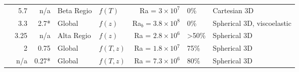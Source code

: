 \begin{landscape}
\begin{longtable}{ @{} p{4cm} r r p{2cm} p{2cm} r p{1.5cm} p{5cm} @{} }
\citet{Vezolainen2004} & 5.7 & n/a & Beta Regio & $f(T)$  & Ra = $3 \times 10^7$ & 0\% & Cartesian 3D \\






\citet{Golle2012} & 3.3 & 2.7*  & Global & $f(z)$ & Ra$_b = 3.8\times 10^8$ & 0\% & Spherical 3D, viscoelastic  \\



\citet{Benesova2012} &  3.25 & n/a   & Alta Regio  & $f(z)$ & Ra = $2.8 \times 10^6$ & \textgreater 50\% & Spherical 3D  \\



\citet{Huang2013} & 2\textendash 3 & 0.75 & Global & $f(T,z)$ & Ra = $1.8\times 10^7$ & 75\% & Spherical 3D  \\

\citet{Yang2016} & n/a & 0.27* & Global & $f(T,z)$ &  Ra = $7.3\times 10^6$ & 80\% & Spherical 3D \\


\bottomrule


\end{longtable}
\end{landscape}


